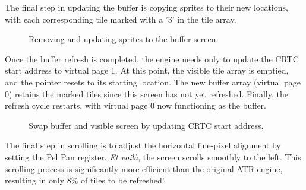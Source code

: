 \documentclass[book.tex]{subfiles}
\begin{document}
  
\pagebreak
The final step in updating the buffer is copying sprites to their new locations, with each corresponding tile marked with a '3' in the tile array. 

\begin{figure}[H]
\centering
 \caption{Removing and updating sprites to the buffer screen.}
 \label{fig:kc4_6_step4}
\end{figure}

\pagebreak
Once the buffer refresh is completed, the engine needs only to update the CRTC start address to virtual page 1. At this point, the visible tile array is emptied, and the pointer resets to its starting location. The new buffer array (virtual page 0) retains the marked tiles since this screen has not yet refreshed. Finally, the refresh cycle restarts, with virtual page 0 now functioning as the buffer. 

\begin{figure}[H]
\centering
 \caption{Swap buffer and visible screen by updating CRTC start address.}
 \label{fig:kc4_6_step4}
\end{figure}

\pagebreak
The final step in scrolling is to adjust the horizontal fine-pixel alignment by setting the Pel Pan register. \textit{Et voil\`a}, the screen scrolls smoothly to the left. This scrolling process is significantly more efficient than the original ATR engine, resulting in only 8\% of tiles to be refreshed!\\
\end{document}

